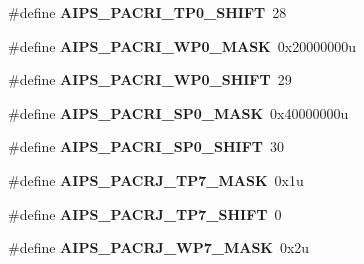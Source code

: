 \begin{DoxyCompactItemize}
\item 
\#define {\bfseries A\+I\+P\+S\+\_\+\+P\+A\+C\+R\+I\+\_\+\+T\+P0\+\_\+\+S\+H\+I\+FT}~28\hypertarget{group__AIPS__Register__Masks_ga33dce6026ec6a9fef299d71c0d8c16bd}{}\label{group__AIPS__Register__Masks_ga33dce6026ec6a9fef299d71c0d8c16bd}

\item 
\#define {\bfseries A\+I\+P\+S\+\_\+\+P\+A\+C\+R\+I\+\_\+\+W\+P0\+\_\+\+M\+A\+SK}~0x20000000u\hypertarget{group__AIPS__Register__Masks_ga38b6146379ddb37dc4dd7d6e138ee5c9}{}\label{group__AIPS__Register__Masks_ga38b6146379ddb37dc4dd7d6e138ee5c9}

\item 
\#define {\bfseries A\+I\+P\+S\+\_\+\+P\+A\+C\+R\+I\+\_\+\+W\+P0\+\_\+\+S\+H\+I\+FT}~29\hypertarget{group__AIPS__Register__Masks_ga626539c0aef04a3456f7c32a4157c953}{}\label{group__AIPS__Register__Masks_ga626539c0aef04a3456f7c32a4157c953}

\item 
\#define {\bfseries A\+I\+P\+S\+\_\+\+P\+A\+C\+R\+I\+\_\+\+S\+P0\+\_\+\+M\+A\+SK}~0x40000000u\hypertarget{group__AIPS__Register__Masks_ga8d3b3e823a7870628490a44e80329353}{}\label{group__AIPS__Register__Masks_ga8d3b3e823a7870628490a44e80329353}

\item 
\#define {\bfseries A\+I\+P\+S\+\_\+\+P\+A\+C\+R\+I\+\_\+\+S\+P0\+\_\+\+S\+H\+I\+FT}~30\hypertarget{group__AIPS__Register__Masks_gaa410004f31a6e724baf4d8cd425137ef}{}\label{group__AIPS__Register__Masks_gaa410004f31a6e724baf4d8cd425137ef}

\item 
\#define {\bfseries A\+I\+P\+S\+\_\+\+P\+A\+C\+R\+J\+\_\+\+T\+P7\+\_\+\+M\+A\+SK}~0x1u\hypertarget{group__AIPS__Register__Masks_ga1f6555984f62501575fd2f9d58ed8a39}{}\label{group__AIPS__Register__Masks_ga1f6555984f62501575fd2f9d58ed8a39}

\item 
\#define {\bfseries A\+I\+P\+S\+\_\+\+P\+A\+C\+R\+J\+\_\+\+T\+P7\+\_\+\+S\+H\+I\+FT}~0\hypertarget{group__AIPS__Register__Masks_ga1e66f58ebd5e384e2fea98ad200c3c4b}{}\label{group__AIPS__Register__Masks_ga1e66f58ebd5e384e2fea98ad200c3c4b}

\item 
\#define {\bfseries A\+I\+P\+S\+\_\+\+P\+A\+C\+R\+J\+\_\+\+W\+P7\+\_\+\+M\+A\+SK}~0x2u\hypertarget{group__AIPS__Register__Masks_ga2dcd14db8aa95d16eabb32f70232a6c8}{}\label{group__AIPS__Register__Masks_ga2dcd14db8aa95d16eabb32f70232a6c8}


\end{DoxyCompactItemize}
